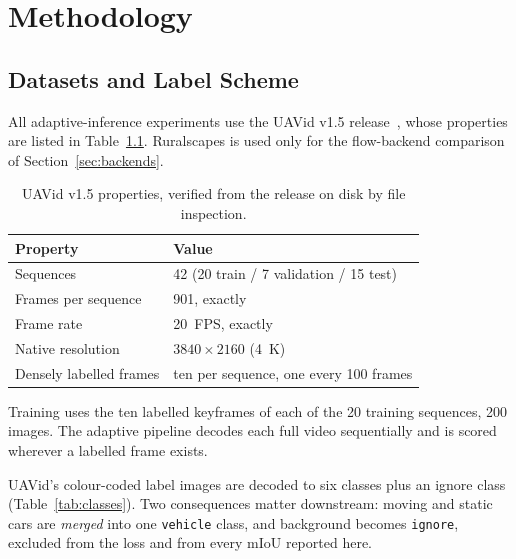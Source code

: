 \documentclass[report.tex]{subfiles}
\begin{document}
\chapter{Methodology}
\label{ch:methodology}

\section{Datasets and Label Scheme}
\label{sec:data}

All adaptive-inference experiments use the UAVid v1.5
release~\cite{uavid2020}, whose properties are listed in
Table~\ref{tab:uavid}. Ruralscapes is used only for the flow-backend
comparison of Section~\ref{sec:backends}.

\begin{table}[t]
    \centering
    \caption[UAVid properties as verified on disk]{UAVid v1.5 properties,
    verified from the release on disk by file inspection.}
    \label{tab:uavid}
    \footnotesize
    \begin{tabular}{@{}ll@{}}
        \toprule
        \textbf{Property} & \textbf{Value} \\
        \midrule
        Sequences                & 42 (20 train / 7 validation / 15 test) \\
        Frames per sequence      & 901, exactly \\
        Frame rate               & \SI{20}{FPS}, exactly \\
        Native resolution        & $3840 \times 2160$ (\SI{4}{K}) \\
        Densely labelled frames  & ten per sequence, one every 100 frames \\
        \bottomrule
    \end{tabular}
\end{table}

Training uses the ten labelled keyframes of each of the 20 training sequences,
200 images. The adaptive pipeline decodes each full video sequentially and is
scored wherever a labelled frame exists.

\label{sec:labels}
UAVid's colour-coded label images are decoded to six classes plus an ignore
class (Table~\ref{tab:classes}). Two consequences matter downstream: moving
and static cars are \emph{merged} into one \texttt{vehicle} class, and
background becomes \texttt{ignore}, excluded from the loss and from every mIoU
reported here.
\end{document}
